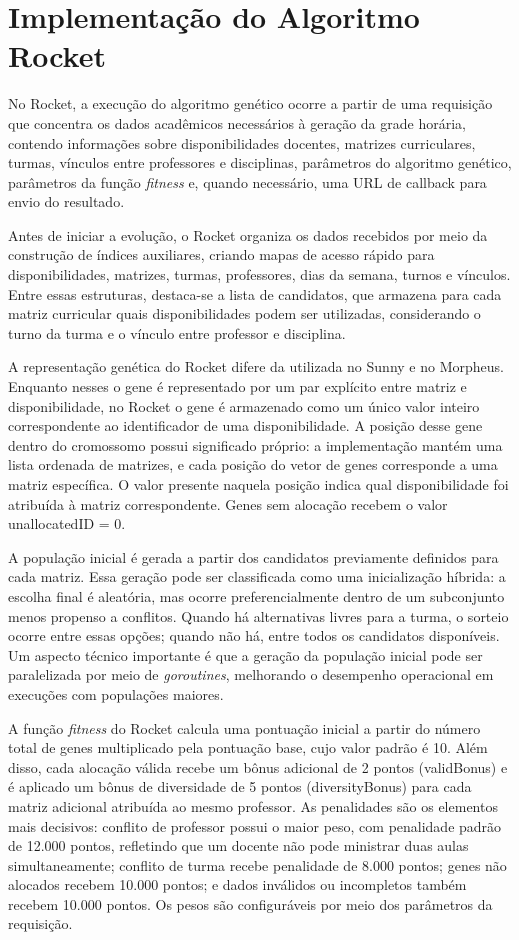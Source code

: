 \section{Implementação do Algoritmo Rocket}
\label{sec:7.3}

No Rocket, a execução do algoritmo genético ocorre a partir de uma requisição que concentra os dados acadêmicos necessários à geração da grade horária, contendo informações sobre disponibilidades docentes, matrizes curriculares, turmas, vínculos entre professores e disciplinas, parâmetros do algoritmo genético, parâmetros da função \textit{fitness} e, quando necessário, uma URL de callback para envio do resultado.

Antes de iniciar a evolução, o Rocket organiza os dados recebidos por meio da construção de índices auxiliares, criando mapas de acesso rápido para disponibilidades, matrizes, turmas, professores, dias da semana, turnos e vínculos. Entre essas estruturas, destaca-se a lista de candidatos, que armazena para cada matriz curricular quais disponibilidades podem ser utilizadas, considerando o turno da turma e o vínculo entre professor e disciplina.

A representação genética do Rocket difere da utilizada no Sunny e no Morpheus. Enquanto nesses o gene é representado por um par explícito entre matriz e disponibilidade, no Rocket o gene é armazenado como um único valor inteiro correspondente ao identificador de uma disponibilidade. A posição desse gene dentro do cromossomo possui significado próprio: a implementação mantém uma lista ordenada de matrizes, e cada posição do vetor de genes corresponde a uma matriz específica. O valor presente naquela posição indica qual disponibilidade foi atribuída à matriz correspondente. Genes sem alocação recebem o valor unallocatedID = 0.

A população inicial é gerada a partir dos candidatos previamente definidos para cada matriz. Essa geração pode ser classificada como uma inicialização híbrida: a escolha final é aleatória, mas ocorre preferencialmente dentro de um subconjunto menos propenso a conflitos. Quando há alternativas livres para a turma, o sorteio ocorre entre essas opções; quando não há, entre todos os candidatos disponíveis. Um aspecto técnico importante é que a geração da população inicial pode ser paralelizada por meio de \textit{goroutines}, melhorando o desempenho operacional em execuções com populações maiores.

A função \textit{fitness} do Rocket calcula uma pontuação inicial a partir do número total de genes multiplicado pela pontuação base, cujo valor padrão é 10. Além disso, cada alocação válida recebe um bônus adicional de 2 pontos (validBonus) e é aplicado um bônus de diversidade de 5 pontos (diversityBonus) para cada matriz adicional atribuída ao mesmo professor. As penalidades são os elementos mais decisivos: conflito de professor possui o maior peso, com penalidade padrão de 12.000 pontos, refletindo que um docente não pode ministrar duas aulas simultaneamente; conflito de turma recebe penalidade de 8.000 pontos; genes não alocados recebem 10.000 pontos; e dados inválidos ou incompletos também recebem 10.000 pontos. Os pesos são configuráveis por meio dos parâmetros da requisição.


